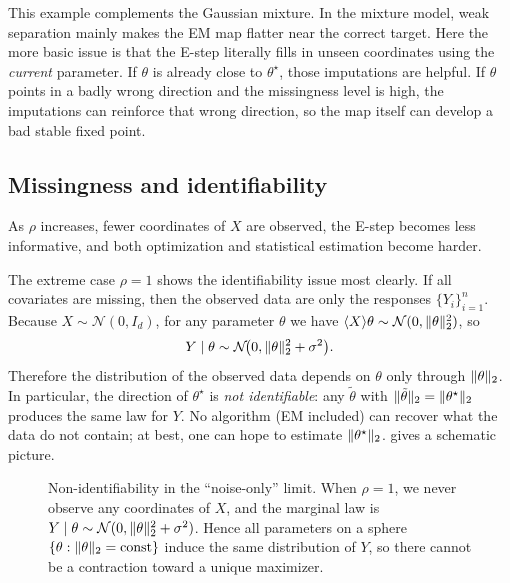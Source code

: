 \documentclass[11pt]{article}
\begin{document}
This example complements the Gaussian mixture.
In the mixture model, weak separation mainly makes the EM map flatter near the correct target.
Here the more basic issue is that the E-step literally fills in unseen coordinates using the \emph{current} parameter.
If $\theta$ is already close to $\theta^\star$, those imputations are helpful.
If $\theta$ points in a badly wrong direction and the missingness level is high, the imputations can reinforce that wrong direction, so the map itself can develop a bad stable fixed point.

\subsection{Missingness and identifiability}
\label{subsec:missing-covariates-identifiability-limit}

As $\rho$ increases, fewer coordinates of $X$ are observed, the E-step becomes less informative, and both optimization and statistical estimation become harder.

The extreme case $\rho=1$ shows the identifiability issue most clearly.
If all covariates are missing, then the observed data are only the responses $\{Y_i\}_{i=1}^n$.
Because $X\sim\mathcal{N}(0,I_d)$, for any parameter $\theta$ we have $\langle X\rangle{\theta}\sim \mathcal{N}(0,\lVert\theta\rVert_2^2)$, so
\[
Y \mid \theta
\sim
\mathcal{N}\!\big(0,\lVert\theta\rVert_2^2+\sigma^2\big).
\]
Therefore the distribution of the observed data depends on $\theta$ only through $\lVert\theta\rVert_2$.
In particular, the direction of $\theta^\star$ is \emph{not identifiable}: any $\tilde\theta$ with $\lVert\tilde\theta\rVert_2=\lVert\theta^\star\rVert_2$ produces the same law for $Y$.
No algorithm (EM included) can recover what the data do not contain; at best, one can hope to estimate $\lVert\theta^\star\rVert_2$.
 gives a schematic picture.

\begin{figure}[t]
  \centering
  
  \caption{Non-identifiability in the ``noise-only'' limit.  When $\rho=1$, we never observe any coordinates of $X$, and the marginal law is $Y\mid\theta\sim\mathcal{N}(0,\lVert\theta\rVert_2^2+\sigma^2)$.  Hence all parameters on a sphere $\{\theta:\lVert\theta\rVert_2=\text{const}\}$ induce the same distribution of $Y$, so there cannot be a contraction toward a unique maximizer.}
  \label{fig:em-nonidentifiability-ridge}
\end{figure}
\end{document}
